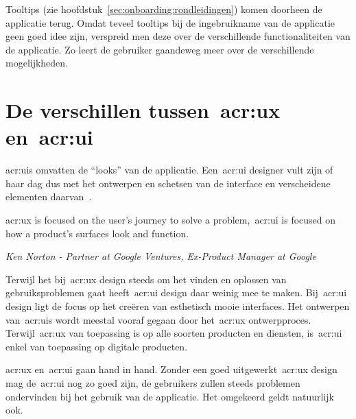 Tooltips (zie hoofdstuk~\ref{sec:onboarding:rondleidingen}) komen doorheen de applicatie terug. Omdat teveel tooltips bij de ingebruikname van de applicatie geen goed idee zijn, verspreid men deze over de verschillende functionaliteiten van de applicatie. Zo leert de gebruiker gaandeweg meer over de verschillende mogelijkheden.

\section{De verschillen tussen~\acrshort{acr:ux} en~\acrshort{acr:ui}}
\label{sec:ux-vs-ui}

\Glspl{acr:ui} omvatten de ``looks'' van de applicatie. Een~\acrshort{acr:ui} designer vult zijn of haar dag dus met het ontwerpen en schetsen van de interface en verscheidene elementen daarvan~\autocite{Lamprecht2019}.

\epigraph{\acrshort{acr:ux} is focused on the user’s journey to solve a problem,~\acrshort{acr:ui} is focused on how a product’s surfaces look and function.}{\textit{Ken Norton - Partner at Google Ventures, Ex-Product Manager at Google}}

Terwijl het bij~\acrshort{acr:ux} design steeds om het vinden en oplossen van gebruiksproblemen gaat heeft~\acrshort{acr:ui} design daar weinig mee te maken. Bij~\acrshort{acr:ui} design ligt de focus op het creëren van esthetisch mooie interfaces. Het ontwerpen van~\glspl{acr:ui} wordt meestal vooraf gegaan door het~\acrshort{acr:ux} ontwerpproces. Terwijl~\acrshort{acr:ux} van toepassing is op alle soorten producten en diensten, is~\acrshort{acr:ui} enkel van toepassing op digitale producten.

\acrfull{acr:ux} en~\acrfull{acr:ui} gaan hand in hand. Zonder een goed uitgewerkt~\acrshort{acr:ux} design mag de~\acrshort{acr:ui} nog zo goed zijn, de gebruikers zullen steeds problemen ondervinden bij het gebruik van de applicatie. Het omgekeerd geldt natuurlijk ook.

